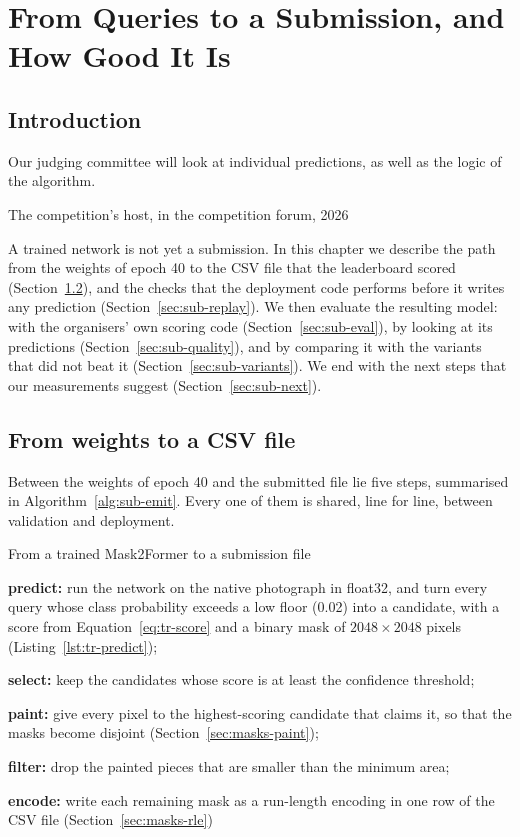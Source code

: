\chapter{From Queries to a Submission, and How Good It Is}\label{ch:submission}

\section{Introduction}\label{sec:sub-intro}
\epigraph{Our judging committee will look at individual predictions, as well as the logic of the
algorithm.}{The competition's host, in the competition forum, 2026}

A trained network is not yet a submission. In this chapter we describe the path from the weights of
epoch 40 to the CSV file that the leaderboard scored (Section~\ref{sec:sub-path}), and the checks that
the deployment code performs before it writes any prediction (Section~\ref{sec:sub-replay}). We then
evaluate the resulting model: with the organisers' own scoring code (Section~\ref{sec:sub-eval}), by
looking at its predictions (Section~\ref{sec:sub-quality}), and by comparing it with the variants that
did not beat it (Section~\ref{sec:sub-variants}). We end with the next steps that our measurements
suggest (Section~\ref{sec:sub-next}).

\section{From weights to a CSV file}\label{sec:sub-path}
Between the weights of epoch 40 and the submitted file lie five steps, summarised in
Algorithm~\ref{alg:sub-emit}. Every one of them is shared, line for line, between validation and
deployment.

\begin{algorithmblock}{From a trained Mask2Former to a submission file\label{alg:sub-emit}}
\item \textbf{predict:} run the network on the native photograph in float32, and turn every query whose class probability exceeds a low floor (0.02) into a candidate, with a score from Equation~\eqref{eq:tr-score} and a binary mask of $2048\times2048$ pixels (Listing~\ref{lst:tr-predict});
\item \textbf{select:} keep the candidates whose score is at least the confidence threshold;
\item \textbf{paint:} give every pixel to the highest-scoring candidate that claims it, so that the masks become disjoint (Section~\ref{sec:masks-paint});
\item \textbf{filter:} drop the painted pieces that are smaller than the minimum area;
\item \textbf{encode:} write each remaining mask as a run-length encoding in one row of the CSV file (Section~\ref{sec:masks-rle})
\end{algorithmblock}

